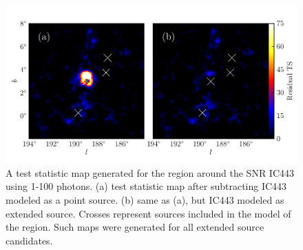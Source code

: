 \documentclass[12pt,preprint]{aastex}
\newcommand{\gev}{\text{GeV}\xspace}
\begin{document}
\begin{figure}
  \begin{center}
  \includegraphics{ic443_plots/res_tsmap_ic443.pdf}

  \caption{
  A test statistic map generated for the region around the SNR 
  IC443 using 1-100 \gev photons.  (a) test statistic map after
  subtracting IC443 modeled as a point source. (b) same as (a), but
  IC443 modeled as extended source. Crosses represent sources included
  in the model of the region.  Such maps were generated for all extended
  source candidates.}
  \label{res_tsmaps}
  \end{center}
\end{figure}
\end{document}
